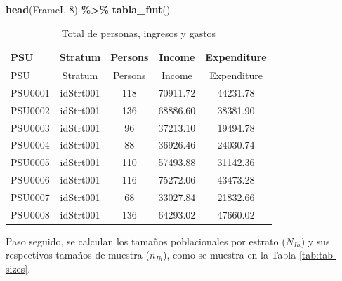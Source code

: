 \documentclass[
  spanish,
  12pt,
]{book}
\newenvironment{Shaded}{\begin{snugshade}}{\end{snugshade}}
\newcommand{\AttributeTok}[1]{\textcolor[rgb]{0.13,0.29,0.53}{#1}}
\newcommand{\DecValTok}[1]{\textcolor[rgb]{0.00,0.00,0.81}{#1}}
\newcommand{\FunctionTok}[1]{\textcolor[rgb]{0.13,0.29,0.53}{\textbf{#1}}}
\newcommand{\NormalTok}[1]{#1}
\newcommand{\OtherTok}[1]{\textcolor[rgb]{0.56,0.35,0.01}{#1}}
\newcommand{\SpecialCharTok}[1]{\textcolor[rgb]{0.81,0.36,0.00}{\textbf{#1}}}
\begin{document}
\begin{Shaded}
\begin{Highlighting}[]
  \FunctionTok{head}\NormalTok{(FrameI, }\DecValTok{8}\NormalTok{) }\SpecialCharTok{\%\textgreater{}\%}
  \FunctionTok{tabla\_fmt}\NormalTok{()}
\end{Highlighting}
\end{Shaded}

\begin{longtable}[]{@{}lcccc@{}}
\caption{\label{tab:tab-BigCity}Total de personas, ingresos y gastos}\tabularnewline
\toprule\noalign{}
PSU & Stratum & Persons & Income & Expenditure \\
\midrule\noalign{}
\endfirsthead
\toprule\noalign{}
PSU & Stratum & Persons & Income & Expenditure \\
\midrule\noalign{}
\endhead
\bottomrule\noalign{}
\endlastfoot
PSU0001 & idStrt001 & 118 & 70911.72 & 44231.78 \\
PSU0002 & idStrt001 & 136 & 68886.60 & 38381.90 \\
PSU0003 & idStrt001 & 96 & 37213.10 & 19494.78 \\
PSU0004 & idStrt001 & 88 & 36926.46 & 24030.74 \\
PSU0005 & idStrt001 & 110 & 57493.88 & 31142.36 \\
PSU0006 & idStrt001 & 116 & 75272.06 & 43473.28 \\
PSU0007 & idStrt001 & 68 & 33027.84 & 21832.66 \\
PSU0008 & idStrt001 & 136 & 64293.02 & 47660.02 \\
\end{longtable}

Paso seguido, se calculan los tamaños poblacionales por estrato (\(N_{Ih}\)) y sus respectivos tamaños de muestra (\(n_{Ih}\)), como se muestra en la Tabla \ref{tab:tab-sizes}.

\begin{Shaded}
\end{Shaded}
\end{document}
